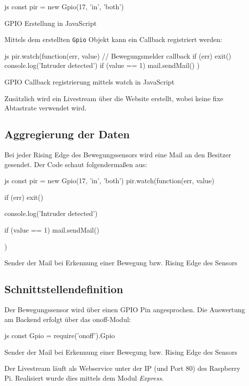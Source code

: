 \begin{listing}
    \begin{code}{js}
    const pir = new Gpio(17, 'in', 'both')
    \end{code}
    \caption{GPIO Erstellung in JavaScript}
\end{listing}

Mittels dem erstellten \texttt{Gpio} Objekt kann ein Callback registriert werden:

\begin{listing}
    \begin{code}[firstnumber=last]{js}
    pir.watch(function(err, value) {
        // Bewegungsmelder callback
        if (err) exit()
        console.log('Intruder detected')
        if (value == 1) {
            mail.sendMail()
        }
    })
    \end{code}
    \caption{GPIO Callback registrierung mittels watch in JavaScript}
\end{listing}

Zusätzlich wird ein Livestream über die Website erstellt, wobei keine fixe Abtastrate verwendet wird.

\clearpage
\subsection{Aggregierung der Daten}
Bei jeder Rising Edge des Bewegungssensors wird eine Mail an den Besitzer gesendet. Der Code schaut folgendermaßen aus:
\begin{listing}
    \begin{code}[firstnumber=last]{js}
    const pir = new Gpio(17, 'in', 'both')
    pir.watch(function(err, value) {
        if (err) exit()

        console.log('Intruder detected')

        if (value == 1) {
            mail.sendMail()
        }
    })
    \end{code}
    \caption{Sender der Mail bei Erkennung einer Bewegung bzw. Rising Edge des Sensors}
\end{listing}

\subsection{Schnittstellendefinition}
Der Bewegungssensor wird über einen GPIO Pin angesprochen. Die Auswertung am Backend erfolgt über das onoff-Modul:
\begin{listing}
    \begin{code}[firstnumber=last]{js}
        const Gpio = require('onoff').Gpio
    \end{code}
    \caption{Sender der Mail bei Erkennung einer Bewegung bzw. Rising Edge des Sensors}
\end{listing}
Der Livestream läuft als Webservice unter der IP (und Port 80) des Raspberry Pi. Realisiert wurde dies mittels dem Modul \textit{Express}.
